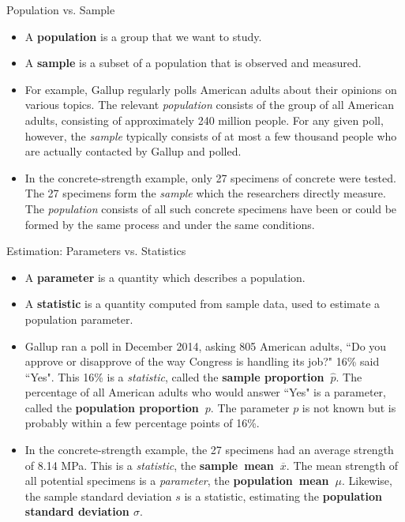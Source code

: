 \documentclass{beamer}
\renewcommand{\emph}{\textbf}
\begin{document}
\begin{frame}{Population vs. Sample}
\begin{itemize}
\item A \emph{population} is a group that we want to study.
\pause\item A \emph{sample} is a subset of a population that is observed and measured.
\pause\item For example, Gallup regularly polls American adults about their opinions on various topics. The relevant \textit{population} consists of the group of all American adults, consisting of approximately 240 million people. For any given poll, however, the \textit{sample} typically consists of at most a few thousand people who are actually contacted by Gallup and polled.
\pause\item In the concrete-strength example, only 27 specimens of concrete were tested. The 27 specimens form the \textit{sample} which the researchers directly measure. The \textit{population} consists of all such concrete specimens have been or could be formed by the same process and under the same conditions.
\end{itemize}
\end{frame}
\begin{frame}{Estimation: Parameters vs. Statistics}
\begin{itemize}
\item A \emph{parameter} is a quantity which describes a population. %
\pause\item A \emph{statistic} is a quantity computed from sample data, used to estimate a population parameter. %
\pause\item Gallup ran a poll in December 2014, asking 805 American adults, ``Do you approve or disapprove of the way Congress is handling its job?"
16\% said ``Yes". This 16\% is a \textit{statistic}, called the \emph{sample proportion~$\hat{p}$}.
The percentage of all American adults who would answer ``Yes" is a parameter, called the \emph{population proportion~$p$}. The parameter $p$ is not known but is probably within a few percentage points of 16\%.
\pause\item In the concrete-strength example, the 27 specimens had an average strength of 8.14 MPa. This is a \textit{statistic}, the \emph{sample~mean~$\overline{x}$}. The mean strength of all potential specimens is a \textit{parameter}, the \emph{population~mean~$\mu$}. Likewise, the sample standard deviation $s$ is a statistic, estimating the \emph{population standard deviation $\sigma$}.
\end{itemize}
\end{frame}
\end{document}
